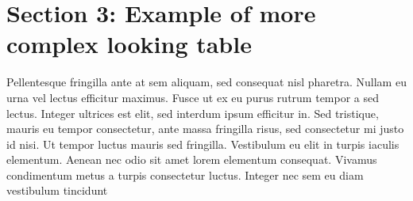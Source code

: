 \section{Section 3: Example of more complex looking table} \label{sec:sec3}
Pellentesque fringilla ante at sem aliquam, sed consequat nisl pharetra. Nullam eu urna vel lectus efficitur maximus. Fusce ut ex eu purus rutrum tempor a sed lectus. Integer ultrices est elit, sed interdum ipsum efficitur in. Sed tristique, mauris eu tempor consectetur, ante massa fringilla risus, sed consectetur mi justo id nisi. Ut tempor luctus mauris sed fringilla. Vestibulum eu elit in turpis iaculis elementum. Aenean nec odio sit amet lorem elementum consequat. Vivamus condimentum metus a turpis consectetur luctus. Integer nec sem eu diam vestibulum tincidunt
\begin{table}
    \centering
    \caption{Example of a more complex looking table}
    \vspace*{0.2cm}
    \label{p1_tab:link_budget}
\end{table}
